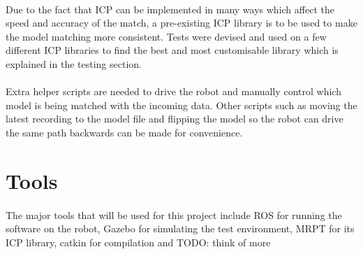 \paragraph{}
Due to the fact that ICP can be implemented in many ways which affect the speed and accuracy of the match, a pre-existing ICP library is to be used to make the model matching more consistent. Tests were devised and used on a few different ICP libraries to find the best and most customisable library which is explained in the testing section.
\paragraph{}
Extra helper scripts are needed to drive the robot and manually control which model is being matched with the incoming data. Other scripts such as moving the latest recording to the model file and flipping the model so the robot can drive the same path backwards can be made for convenience.


\section{Tools}
\paragraph{}
The major tools that will be used for this project include ROS\cite{ROS} for running the software on the robot, Gazebo\cite{Gazebo} for simulating the test environment, MRPT\cite{Blanco-Claraco2019} for its ICP library\cite{MRPT-ICP}, catkin\cite{CATKIN} for compilation and TODO: think of more

